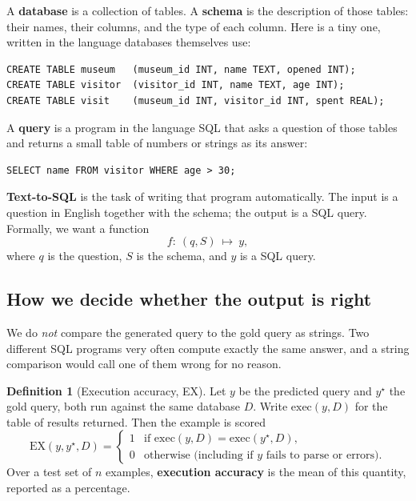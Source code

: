 \documentclass[11pt]{article}
\theoremstyle{definition}
\newtheorem{definition}[theorem]{Definition}
\begin{document}
A \textbf{database} is a collection of tables. A \textbf{schema} is the description of those tables: their names, their columns, and the type of each column. Here is a tiny one, written in the language databases themselves use:

\begin{lstlisting}
CREATE TABLE museum   (museum_id INT, name TEXT, opened INT);
CREATE TABLE visitor  (visitor_id INT, name TEXT, age INT);
CREATE TABLE visit    (museum_id INT, visitor_id INT, spent REAL);
\end{lstlisting}

A \textbf{query} is a program in the language SQL that asks a question of those tables and returns a small table of numbers or strings as its answer:

\begin{lstlisting}
SELECT name FROM visitor WHERE age > 30;
\end{lstlisting}

\textbf{Text-to-SQL} is the task of writing that program automatically. The input is a question in English together with the schema; the output is a SQL query. Formally, we want a function
\[
f:\ (q, S)\ \longmapsto\ y,
\]
where $q$ is the question, $S$ is the schema, and $y$ is a SQL query.

\subsection{How we decide whether the output is right}

We do \emph{not} compare the generated query to the gold query as strings. Two different SQL programs very often compute exactly the same answer, and a string comparison would call one of them wrong for no reason.

\begin{definition}[Execution accuracy, EX]
\label{def:ex}
Let $y$ be the predicted query and $y^\star$ the gold query, both run against the same database $D$. Write $\mathrm{exec}(y, D)$ for the table of results returned. Then the example is scored
\[
\mathrm{EX}(y,y^\star,D)=
\begin{cases}
1 & \text{if } \mathrm{exec}(y,D) = \mathrm{exec}(y^\star, D),\\[2pt]
0 & \text{otherwise (including if $y$ fails to parse or errors).}
\end{cases}
\]
Over a test set of $n$ examples, \textbf{execution accuracy} is the mean of this quantity, reported as a percentage.
\end{definition}
\end{document}
